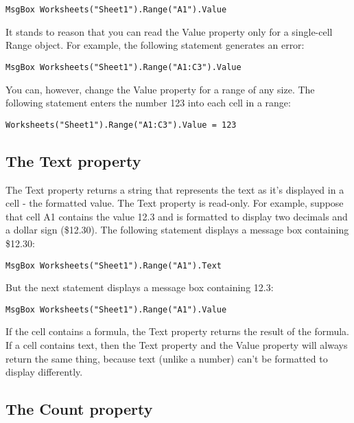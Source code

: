 \documentclass[
]{article}
\theoremstyle{definition}
\theoremstyle{definition}
\theoremstyle{definition}
\theoremstyle{definition}
\theoremstyle{remark}
\begin{document}
\begin{verbatim}
MsgBox Worksheets("Sheet1").Range("A1").Value
\end{verbatim}

It stands to reason that you can read the Value property only for a single-cell Range object. For example, the following statement generates
an error:

\begin{verbatim}
MsgBox Worksheets("Sheet1").Range("A1:C3").Value
\end{verbatim}

You can, however, change the Value property for a range of any size. The
following statement enters the number 123 into each cell in a range:

\begin{verbatim}
Worksheets("Sheet1").Range("A1:C3").Value = 123
\end{verbatim}

\hypertarget{the-text-property}{%
\subsection{The Text property}\label{the-text-property}}

The Text property returns a string that represents the text as it's displayed in a cell - the formatted value. The Text property is read-only. For example, suppose that cell A1 contains the value 12.3 and
is formatted to display two decimals and a dollar sign (\$12.30). The following statement displays a message box containing \$12.30:

\begin{verbatim}
MsgBox Worksheets("Sheet1").Range("A1").Text
\end{verbatim}

But the next statement displays a message box containing 12.3:

\begin{verbatim}
MsgBox Worksheets("Sheet1").Range("A1").Value
\end{verbatim}

If the cell contains a formula, the Text property returns the result of the formula. If a cell contains text, then the Text property and the
Value property will always return the same thing, because text (unlike a number) can't be formatted to display differently.

\hypertarget{the-count-property}{%
\subsection{The Count property}\label{the-count-property}}
\end{document}
